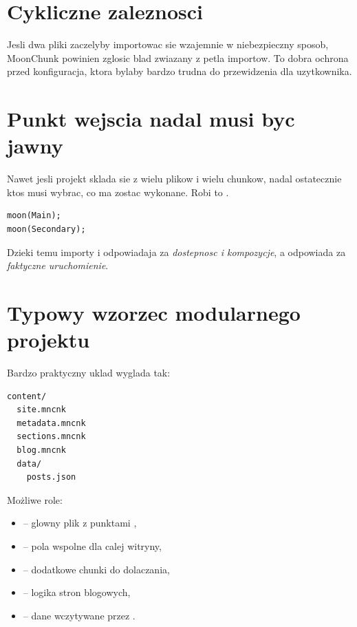 \section{Cykliczne zaleznosci}
Jesli dwa pliki zaczelyby importowac sie wzajemnie w niebezpieczny sposob, MoonChunk
powinien zglosic blad zwiazany z petla importow. To dobra ochrona przed konfiguracja,
ktora bylaby bardzo trudna do przewidzenia dla uzytkownika.

\section{Punkt wejscia nadal musi byc jawny}
Nawet jesli projekt sklada sie z wielu plikow i wielu chunkow, nadal ostatecznie ktos
musi wybrac, co ma zostac wykonane. Robi to .

\begin{lstlisting}[style=moonchunk,caption={Jawne wywolania punktow wejscia}]
moon(Main);
moon(Secondary);
\end{lstlisting}

Dzieki temu importy i  odpowiadaja za \emph{dostepnosc i kompozycje},
a  odpowiada za \emph{faktyczne uruchomienie}.

\section{Typowy wzorzec modularnego projektu}
Bardzo praktyczny uklad wyglada tak:

\begin{lstlisting}[style=basecode,caption={Przykladowy projekt wieloplikowy}]
content/
  site.mncnk
  metadata.mncnk
  sections.mncnk
  blog.mncnk
  data/
    posts.json
\end{lstlisting}

Możliwe role:

\begin{itemize}
  \item {} -- glowny plik z punktami ,
  \item {} -- pola wspolne dla calej witryny,
  \item {} -- dodatkowe chunki do dolaczania,
  \item {} -- logika stron blogowych,
  \item {} -- dane wczytywane przez .
\end{itemize}

